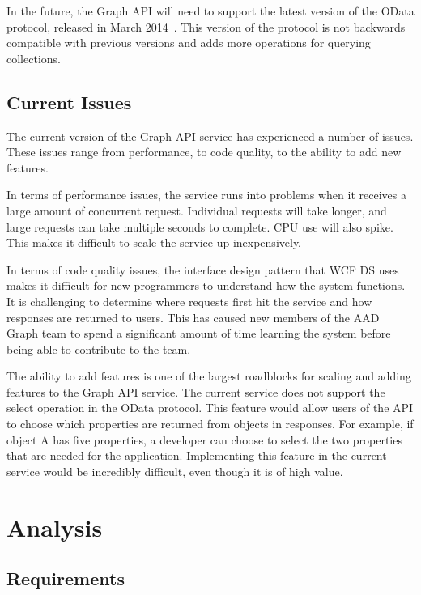 \documentclass[se]{uw-wkrpt}
\begin{document}
In the future, the Graph API will need to support the latest version of the OData protocol, released in March 2014~\cite{ref:odatav}. This version of the protocol is not backwards compatible with previous versions and adds more operations for querying collections.


\subsection{Current Issues}\label{subsec:issues}

The current version of the Graph API service has experienced a number of issues. These issues range from performance, to code quality, to the ability to add new features.

In terms of performance issues, the service runs into problems when it receives a large amount of concurrent request. Individual requests will take longer, and large requests can take multiple seconds to complete. CPU use will also spike. This makes it difficult to scale the service up inexpensively.

In terms of code quality issues, the interface design pattern that WCF DS uses makes it difficult for new programmers to understand how the system functions. It is challenging to determine where requests first hit the service and how responses are returned to users. This has caused new members of the AAD Graph team to spend a significant amount of time learning the system before being able to contribute to the team.

The ability to add features is one of the largest roadblocks for scaling and adding features to the Graph API service. The current service does not support the select operation in the OData protocol. This feature would allow users of the API to choose which properties are returned from objects in responses. For example, if object A has five properties, a developer can choose to select the two properties that are needed for the application. Implementing this feature in the current service would be incredibly difficult, even though it is of high value.

\section{Analysis}

\subsection{Requirements}\label{subsec:req}
\end{document}
